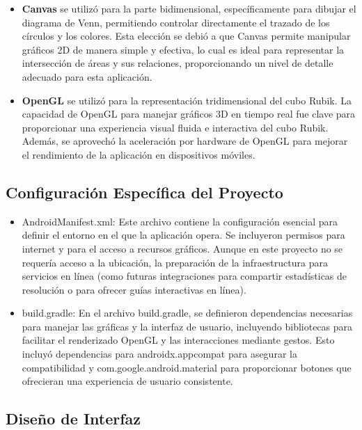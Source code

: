                                                                                                                                                                                                                                                                                                                                                                                                                                                                                                                                                                                                                                                                                                                                                                                                                                                                                                                                                                                                                                                                                                                                                                                                                                                                                                                                                                                                                                                                                                                                                                                                                                                                                                                                                                                                                                                                                                                                                                                                                                                                                                                                                                                                                                                                                                                                                                                                                                                                                                                                                                                                                                                                                                                                                                                                                                                                                                                                                                                                                                                                                                                                                                                                                                                                                                                                                                                                                                                                                                                                                                                                                                                                                                                                                                                                                                                                                                                                                                                                                                                                                                                                                                                                                                                                                                                                                                                                                                                                                                                                                                                                                                                                                                                                                                                                                                                                                                                                                                                                                                                                                                                                                                                                                                                                                                                                                                                                                                                                                                                                                                                                                                                                                                                                                                                                                                                                                                                                                                                                                                                                                                                                                                                                                                                                                                                                                                                                                                                                                                                                                                                                                                                                                                                                                                                                                                                                                                                                                                                                                                                                                                                                                                                                                                                                                                                                                                                                                                                                                                                                                                                                                                                                                                                                                                                                                                                                                                                                                                                                                                                                                                                                                                                                                                                                                                                                                                                                                                                                                                                                                                                                                                                                                                                                                                                                                                                                                                                                                                                                                                                                                                                                                                                                                                                                                                                                                                                                                                                                                                                                                                                                                                                                                                                                                                                                                                                                                                                                                                                                                                                                                                                                                                                                                                                                                                                                                                                                                                                                                                                                                                                                                                                                                                                                                                                                                                                                                                                                                                                                                                                                                                                                                                                                                                                                                                                                                                                                                                                                                                                                                                                                                                                                                                                                                                                                                                                                                                                                                                                                                                                                                                                                                                                                                                                                                                                                                                                                                                                                                                                                                                                                                                                                                                                                                                                                                                                                                                                                                                                                                                                                                                                                                                                                                                                                                                                                                                                                                                                                                                                                                                                                                                                                                                                                                                                                                                                                                                                                                                                                                                                                                                                                                                                                                                                                                                                                                                                                                                                                                                                                                                                                                                                                                                                                                                                                                                                                                                                                                                                                                                                                                                                                                                                                                                                                                                                                                                                                                                                                                                                                                                                                                                                                                                                                                                                                                                                                                                                                                                                                                                                                                                                                                                                                                                                                                                                                                                                                                                                                                                                                                                                                                                                                                                                                                                                                                                                                                                                                                                                                                                                                                                                                                                                                                                                                                                                                                                                                                                                                                                                                                                                                                                                                                                                                                                                                                                                                                                                                                                                                                                                                                                                                                                                                                                                                                                                                                                                                                                                                                                                                                                                                                                                                                                                                                                                                                                                                                                                                                                                                                                                                                                                                                                                                                                                                                                                                                                                                                                                                                                                                                                                                                                                                                                                                                                                                                                                                                                                                                                                                                                                                                                                                                                                                                                                                                                                                                                                                                                                                                                                                                                                                                                                                                                                                                                                                                                                                                                                                                                                                                                                                                                                                                                                                                                                                                                                                                                                                                                                                                                                                                                                                                                                                                                                                                                                                                                                                                                                                                                                                                                                                                                                                                                                                                                                                                                                                                                                                                                                                                                                                                                                                                                                                                                                                                                                                                                                                                                                                                                                                                                                                                                                                                                                                                                                                                                                                                                                                                                                                                                                                                                                                                                                                                                                                                                                                                                                                                                                                                                                                                                                                                                                                                                                                                                                                                                                                                                                                                                                                                                                                                                                                                                                                                                                                                                                                                                                                                                                                                                                                                                                                                                                                                                                                                                                                                                                                                                                                                                                                                                                                                                                                                                                                                                                                                                                                                                                                                                                                                                                                                                                                                                                                                                                                                                                                                                                                                                                                                                                                                                                                                                                                                                                                                                                                                                                                                                                                                                                                                                                                                                                                                                                                                                                                                                                                                                                                                                                                                                                                                                                                                                                                                                                                                                                                                                                                                                                                                                                                                                                                                                                                                                                                                                                                                                                                                                                                                                                                                                                                                                                                                                                                                                                                                                                                                                                                                                                                                                                                                                                                                                                                                                                                                                                                                                                                                                                                                                                                                                                                                                                                                                                                                                                                                                                                                                                                                                                                                                                                                                                                                                                                                                                                                                                                                                                                                                                                                                                                                                                                                                                                                                                                                                                                                                                                                                                                                                                                                                                                                                                                                                                                                                                                                                                                                                                                                                                                                                                                                                                                                                                                                                                                                                                                                                                                                                                                                                                                                                                                                                                                                                                                                                                                                                                                                                                                                                                                                                                                                                                                                                                                                                                                                                                                                                                                                                                                                                                                                                                                                                                                                                                                                                                                                                                                                                                                                                                                                                                                                                                                                                                                                                                                                                                                                                                                                                                                                                                                                                                                                                                                                                                                                                                                                                                                                                                                                                                                                                                                                                                                                                                                                                                                                                                                                                                                                                                                                                                                                                                                                                                                                                                                                                                                                                                                                                                                                                                                                                                                                                                                                                                                                                                                                                                                                                                                                                                                                                                                                                                                                                                                                                                                                                                                                                                                                                                                                                                                                                                                                                                                                                                                                                                                                                                                                                                                                                                                                                                                                                                                                                                                                                                                                                                                                                                                                                                                                                                                                                                                                                                                                                                                                                                                                                                                                                                                                                                                                                                                                                                                                                                                                                                                                                                                                                                                                                                                                                                                                                                                                                                                                                                                                                                                                                                                                                                                                                                                                                                                                                                                                                                                                                                                                                                                                                                                                                                                                                                                                                                                                                                                                                                                                                                                                                                                                                                                                                                                                                                                                                                                                                                                                                                                                                                                                                                                                                                                                                                                                                                                                                                                                                                                                                                                                                                                                                                                                                                                                                                                                                                                                                                                                                                                                                                                                                                                                                                                                                                                                                                                                                                                                                                                                                                                                                                                                                                                                                                                                                                                                                                                                                                                                                                                                                                                                                                                                                                                                                                                                                                                                                                                                                                                                                                                                                                                                                                                                                                                                                                                                                                                                                                                                                                                                                                                                                                                                                                                                                                                                                                                                                                                                                                                                                                                                                                                                                                                                                                                                                                                                                                                                                                                                                                                                                                                                                                                                                                                                                                                                                                                                                                                                                                                                                                                                                                                                                                                                                                                                                                                                                                                                                                                                                                                                                                                                                                                                                                                                                                                                                                                                                                                                                                                                                                                                                                                                                                                                                                                                                                                                                                                                                                                                                                                                                                                                                                                                                                                                                                                                                                                                                                                                                                                                                                                                                                                                                                                                                                                                                                                                                                                                                                \documentclass[conference]{IEEEtran}
\begin{document}
\begin{itemize}
    \item \textbf{Canvas} se utilizó para la parte bidimensional, específicamente para dibujar el diagrama de Venn, permitiendo controlar directamente el trazado de los círculos y los colores. Esta elección se debió a que Canvas permite manipular gráficos 2D de manera simple y efectiva, lo cual es ideal para representar la intersección de áreas y sus relaciones, proporcionando un nivel de detalle adecuado para esta aplicación.
    
    \item \textbf{OpenGL} se utilizó para la representación tridimensional del cubo Rubik. La capacidad de OpenGL para manejar gráficos 3D en tiempo real fue clave para proporcionar una experiencia visual fluida e interactiva del cubo Rubik. Además, se aprovechó la aceleración por hardware de OpenGL para mejorar el rendimiento de la aplicación en dispositivos móviles. 
\end{itemize}

\subsection{Configuración Específica del Proyecto} 

\begin{itemize}
    \item AndroidManifest.xml: Este archivo contiene la configuración esencial para definir el entorno en el que la aplicación opera. Se incluyeron permisos para internet y para el acceso a recursos gráficos. Aunque en este proyecto no se requería acceso a la ubicación, la preparación de la infraestructura para servicios en línea (como futuras integraciones para compartir estadísticas de resolución o para ofrecer guías interactivas en línea).
    \item build.gradle: En el archivo build.gradle, se definieron dependencias necesarias para manejar las gráficas y la interfaz de usuario, incluyendo bibliotecas para facilitar el renderizado OpenGL y las interacciones mediante gestos. Esto incluyó dependencias para androidx.appcompat para asegurar la compatibilidad y com.google.android.material para proporcionar botones que ofrecieran una experiencia de usuario consistente.
    
\end{itemize}

\subsection{Diseño de Interfaz} 
\end{document}
